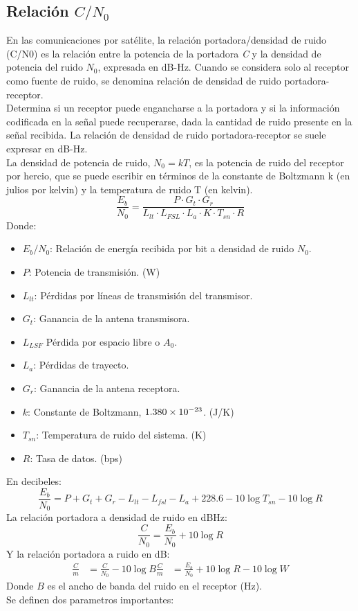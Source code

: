 \documentclass[
	12pt, %
	fleqn, %
	a4paper, %
	oneside, %
]{LegrandOrangeBook}
\begin{document}
\subsection{Relación $C/N_0$}
En las comunicaciones por satélite, la relación portadora/densidad de ruido (C/N0) es la relación entre la potencia de la portadora \textit{C} y la densidad de potencia del ruido $N_0$, expresada en dB-Hz. Cuando se considera solo al receptor como fuente de ruido, se denomina relación de densidad de ruido portadora-receptor.\\
Determina si un receptor puede engancharse a la portadora y si la información codificada en la señal puede recuperarse, dada la cantidad de ruido presente en la señal recibida. La relación de densidad de ruido portadora-receptor se suele expresar en dB-Hz.\\
La densidad de potencia de ruido, $N_0=kT$, es la potencia de ruido del receptor por hercio, que se puede escribir en términos de la constante de Boltzmann k (en julios por kelvin) y la temperatura de ruido T (en kelvin).
\begin{equation}
\frac{E_b}{N_0}=\frac{P\cdot G_t\cdot G_r}{L_{lt}\cdot L_{FSL}\cdot L_a\cdot K\cdot T_{sn}\cdot R}
\end{equation}
Donde:
\begin{itemize}
\item $E_b/N_0$: Relación de energía recibida por bit a densidad de ruido $N_0$.
\item $P$: Potencia de transmisión. (W)
\item $L_{lt}$: Pérdidas por líneas de transmisión del transmisor.
\item $G_t$: Ganancia de la antena transmisora.
\item $L_{LSF}$ Pérdida por espacio libre o $A_0$.
\item $L_a$: Pérdidas de trayecto.
\item $G_r$: Ganancia de la antena receptora.
\item $k$: Constante de Boltzmann, $1.380\times 10^{-23}$. (J/K)
\item $T_{sn}$: Temperatura de ruido del sistema. (K)
\item $R$: Tasa de datos. (bps)
\end{itemize}
En decibeles:
\begin{equation}
\frac{E_b}{N_0}=P+G_t+G_r-L_{lt}-L_{fsl}-L_a+228.6-10\log T_{sn}-10\log R
\end{equation}
La relación portadora a densidad de ruido en dBHz:
\begin{equation}
\frac{C}{N_0}=\frac{E_b}{N_0}+10\log R
\end{equation}
Y la relación portadora a ruido en dB:
\begin{align}
\frac{C}{m}&=\frac{C}{N_0}-10\log B
\frac{C}{m}&=\frac{E_b}{N_0}+10\log R-10\log W
\end{align}
Donde $B$ es el ancho de banda del ruido en el receptor (Hz).\\
Se definen dos parametros importantes:
\end{document}
